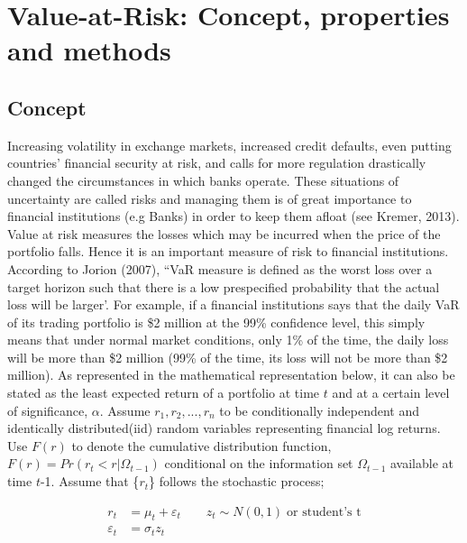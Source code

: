 \documentclass[a4paper,11pt,oneside]{book}
\begin{document}
\chapter{Value-at-Risk: Concept,  properties and methods}


\section{Concept}
Increasing volatility in exchange markets, increased credit defaults, even putting countries' financial security at risk, and calls for more regulation drastically changed the circumstances in which banks operate. These situations of uncertainty are called risks and managing them is of great importance to financial institutions (e.g Banks) in order to keep them afloat (see Kremer, 2013). Value at risk measures the losses which may be incurred when the price of the portfolio falls. Hence it is an important measure of risk to financial institutions.
\newline\newline
According to Jorion (2007), “VaR measure is defined as the worst loss over a target horizon such that there is a low prespecified probability that the actual loss will be larger'. For example, if a financial institutions says that
the daily VaR of its trading portfolio is \$2 million at the 99\%
confidence level, this simply means that under normal market conditions,
only 1\% of the time, the daily loss will be more than \$2 million (99\% of the time, its loss will not be more than \$2 million). As represented in the mathematical representation below, it can also be stated as the least expected return of a portfolio at time $t$ and at a certain level of significance, $\alpha$.
\newline\newline
Assume $r_1, r_2, ..., r_n$ to be conditionally independent and identically distributed(iid) random variables representing financial log returns. Use $F(r)$ to denote the cumulative distribution function,
$F(r) = Pr(r_{t} < r|\Omega_{t-1})$ conditional on the information set $\Omega_{t-1}$ available at time $t$-1. Assume that \{$r_t$\} follows the stochastic process; \newline

\begin{equation}
\begin{aligned}
r_t &= \mu_t + \varepsilon_t   \quad \quad z_t \sim N(0,1) \; \text{or student's t}
\\ 
\varepsilon_t &= \sigma_t  z_t
\label{1}
\end{aligned}
\end{equation}
\end{document}
